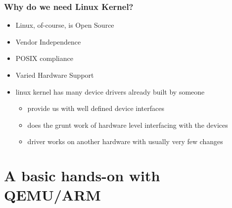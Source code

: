 \documentclass[11pt]{beamer}
\begin{document}
\begin{frame}[fragile]\frametitle{Why do we need Linux Kernel?}
\label{sec-3.3}

\begin{itemize}

\item Linux, of-course, is Open Source\\
\label{sec-3.3.1}


\item Vendor Independence\\
\label{sec-3.3.2}


\item POSIX compliance\\
\label{sec-3.3.3}


\item Varied Hardware Support\\
\label{sec-3.3.4}


\item linux kernel has many device drivers already built by someone\\
\label{sec-3.3.5}

\begin{itemize}

\item provide us with well defined device interfaces\\
\label{sec-3.3.5.1}


\item does the grunt work of hardware level interfacing with the devices\\
\label{sec-3.3.5.2}


\item driver works on another hardware with usually very few changes\\
\label{sec-3.3.5.3}


\end{itemize} %
\end{itemize} %
\end{frame}
\section{A basic hands-on with QEMU/ARM}
\label{sec-4}
\end{document}
